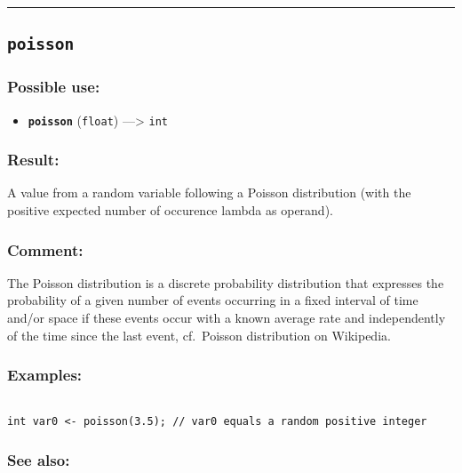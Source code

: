 \documentclass[]{book}
\providecommand{\tightlist}{%
  \setlength{\itemsep}{0pt}\setlength{\parskip}{0pt}}
\theoremstyle{definition}
\theoremstyle{definition}
\theoremstyle{definition}
\theoremstyle{remark}
\begin{document}
\begin{center}\rule{0.5\linewidth}{\linethickness}\end{center}

\subsection{\texorpdfstring{\texttt{poisson}}{poisson}}\label{poisson}

\subsubsection{Possible use:}\label{possible-use-412}

\begin{itemize}
\tightlist
\item
  \textbf{\texttt{poisson}} (\texttt{float}) ---\textgreater{}
  \texttt{int}
\end{itemize}

\subsubsection{Result:}\label{result-398}

A value from a random variable following a Poisson distribution (with
the positive expected number of occurence lambda as operand).

\subsubsection{Comment:}\label{comment-78}

The Poisson distribution is a discrete probability distribution that
expresses the probability of a given number of events occurring in a
fixed interval of time and/or space if these events occur with a known
average rate and independently of the time since the last event,
cf.~Poisson distribution on Wikipedia.

\subsubsection{Examples:}\label{examples-286}

\begin{verbatim}
 
int var0 <- poisson(3.5); // var0 equals a random positive integer
\end{verbatim}

\subsubsection{See also:}\label{see-also-165}
\end{document}

